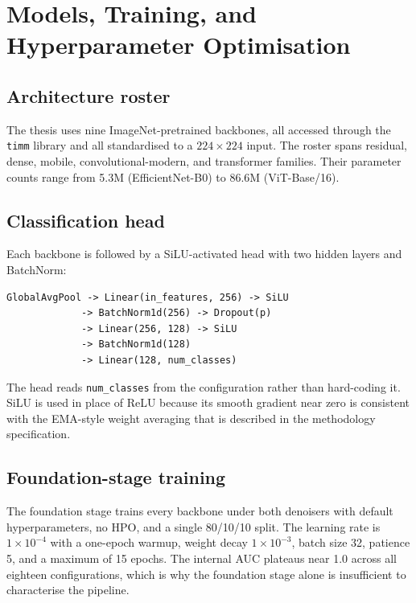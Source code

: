 \documentclass[../preamble.tex]{subfiles}
\begin{document}
\chapter{Models, Training, and Hyperparameter Optimisation}
\label{ch:training}

\section{Architecture roster}
\label{sec:train-roster}

The thesis uses nine ImageNet-pretrained backbones, all accessed through the
\texttt{timm} library and all standardised to a $224 \times 224$ input. The
roster spans residual, dense, mobile, convolutional-modern, and transformer
families. Their parameter counts range from 5.3M (EfficientNet-B0) to 86.6M
(ViT-Base/16).



\section{Classification head}
\label{sec:train-head}

Each backbone is followed by a SiLU-activated head with two hidden layers and
BatchNorm:
\begin{verbatim}
GlobalAvgPool -> Linear(in_features, 256) -> SiLU
             -> BatchNorm1d(256) -> Dropout(p)
             -> Linear(256, 128) -> SiLU
             -> BatchNorm1d(128)
             -> Linear(128, num_classes)
\end{verbatim}
The head reads \texttt{num\_classes} from the configuration rather than
hard-coding it. SiLU is used in place of ReLU because its smooth gradient
near zero is consistent with the EMA-style weight averaging that is
described in the methodology specification.

\section{Foundation-stage training}
\label{sec:train-foundation}

The foundation stage trains every backbone under both denoisers with default
hyperparameters, no HPO, and a single 80/10/10 split. The learning rate is
$1 \times 10^{-4}$ with a one-epoch warmup, weight decay $1 \times 10^{-3}$,
batch size 32, patience 5, and a maximum of 15 epochs. The internal AUC
plateaus near 1.0 across all eighteen configurations, which is why the
foundation stage alone is insufficient to characterise the pipeline.
\end{document}
